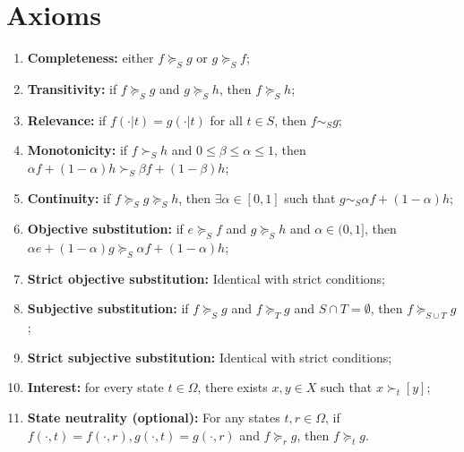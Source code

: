 \documentclass[12pt, openany]{report}
\theoremstyle{definition}
\begin{document}
\section{Axioms}
\begin{enumerate}
	\item \textbf{Completeness:} either $f\succcurlyeq_S g$ or $g\succcurlyeq_S f$;
	\item \textbf{Transitivity:} if $f\succcurlyeq_S g$ and $g\succcurlyeq_S h$, then $f\succcurlyeq_S h$;
	\item \textbf{Relevance:} if $f(\cdot |t)=g(\cdot |t)$ for all $t\in S$, then $f\sim_S g$;
	\item \textbf{Monotonicity:} if $f\succ_S h$ and $0\le \beta \le \alpha \le 1$, then $\alpha f+(1-\alpha)h\succ_S \beta f+(1-\beta)h$;
	\item \textbf{Continuity:} if $f\succcurlyeq_S g\succcurlyeq_S h$, then $\exists \alpha\in [0,1]$ such that $g\sim_S\alpha f+(1-\alpha)h$;
	\item \textbf{Objective substitution:} if $e\succcurlyeq_S f$ and $g\succcurlyeq_S h$ and $\alpha \in (0,1]$, then $\alpha e+(1-\alpha)g\succcurlyeq_S \alpha f+(1-\alpha)h$;
	\item \textbf{Strict objective substitution:} Identical with strict conditions;
	\item \textbf{Subjective substitution:} if $f\succcurlyeq_S g$ and $f\succcurlyeq_T g$ and $S\cap T=\emptyset$, then $f\succcurlyeq_{S\cup T} g$;
	\item \textbf{Strict subjective substitution:} Identical with strict conditions;
	\item \textbf{Interest:} for every state $t\in \Omega$, there exists $x,y\in X$ such that $x\succ_t [y]$;
	\item \textbf{State neutrality (optional):} For any states $t,r\in \Omega$, if $f(\cdot,t)=f(\cdot, r), g(\cdot,t)=g(\cdot,r)$ and $f\succcurlyeq_r g$, then $f\succcurlyeq_t g$.
\end{enumerate}
\end{document}
